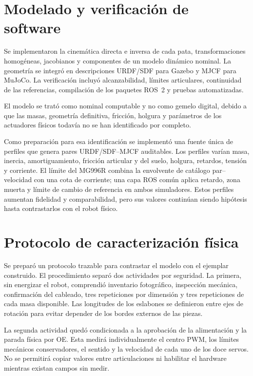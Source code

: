 \section{Modelado y verificación de software}

Se implementaron la cinemática directa e inversa de cada pata, transformaciones
homogéneas, jacobianos y componentes de un modelo dinámico nominal. La geometría
se integró en descripciones URDF/SDF para Gazebo y MJCF para MuJoCo. La
verificación incluyó alcanzabilidad, límites articulares, continuidad de las
referencias, compilación de los paquetes ROS~2 y pruebas automatizadas.

El modelo se trató como nominal computable y no como gemelo digital, debido a
que las masas, geometría definitiva, fricción, holgura y parámetros de los
actuadores físicos todavía no se han identificado por completo.

Como preparación para esa identificación se implementó una fuente única de
perfiles que genera pares URDF/SDF--MJCF auditables. Los perfiles varían masa,
inercia, amortiguamiento, fricción articular y del suelo, holgura, retardos,
tensión y corriente. El límite del MG996R combina la envolvente de catálogo
par--velocidad con una cota de corriente; una capa ROS común aplica retardo,
zona muerta y límite de cambio de referencia en ambos simuladores. Estos
perfiles aumentan fidelidad y comparabilidad, pero sus valores continúan siendo
hipótesis hasta contrastarlos con el robot físico.

\section{Protocolo de caracterización física}

Se preparó un protocolo trazable para contrastar el modelo con el ejemplar
construido. El procedimiento separó dos actividades por seguridad. La primera,
sin energizar el robot, comprendió inventario fotográfico, inspección mecánica,
confirmación del cableado, tres repeticiones por dimensión y tres repeticiones
de cada masa disponible. Las longitudes de los eslabones se definieron entre
ejes de rotación para evitar depender de los bordes externos de las piezas.

La segunda actividad quedó condicionada a la aprobación de la alimentación y
la parada física por OE. Esta medirá individualmente el centro PWM, los límites
mecánicos conservadores, el sentido y la velocidad de cada uno de los doce
servos. No se permitirá copiar valores entre articulaciones ni habilitar el
hardware mientras existan campos sin medir.

